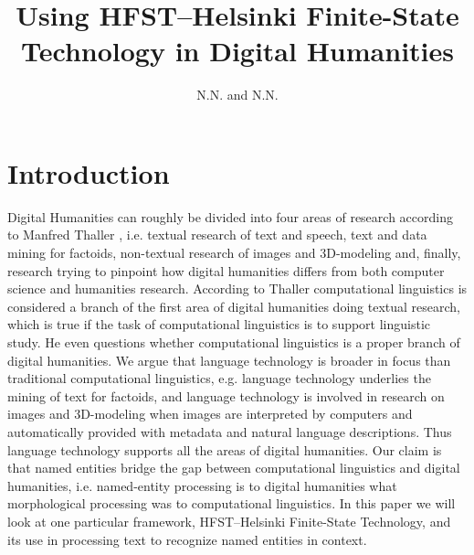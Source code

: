 \documentclass{llncs}
\begin{document}
%
\title{Using HFST--Helsinki Finite-State Technology in Digital Humanities}
%
\author{N.N. and N.N.}


\maketitle


\begin{abstract}
\end{abstract}

\section*{Introduction}
Digital Humanities can roughly be divided into four areas of research
according to Manfred Thaller \cite{Thaller2012}, i.e. textual research
of text and speech, text and data mining for factoids, non-textual
research of images and 3D-modeling and, finally, research trying to
pinpoint how digital humanities differs from both computer science and
humanities research. According to Thaller computational linguistics is
considered a branch of the first area of digital humanities doing
textual research, which is true if the task of computational
linguistics is to support linguistic study. He even questions whether
computational linguistics is a proper branch of digital humanities. We
argue that language technology is broader in focus than traditional
computational linguistics, e.g. language technology underlies the
mining of text for factoids, and language technology is involved in
research on images and 3D-modeling when images are interpreted by
computers and automatically provided with metadata and natural
language descriptions. Thus language technology supports all the areas
of digital humanities. Our claim is that named entities bridge the gap
between computational linguistics and digital humanities,
i.e. named-entity processing is to digital humanities what
morphological processing was to computational linguistics. In this
paper we will look at one particular framework, HFST--Helsinki
Finite-State Technology, and its use in processing text to recognize
named entities in context.
\end{document}
